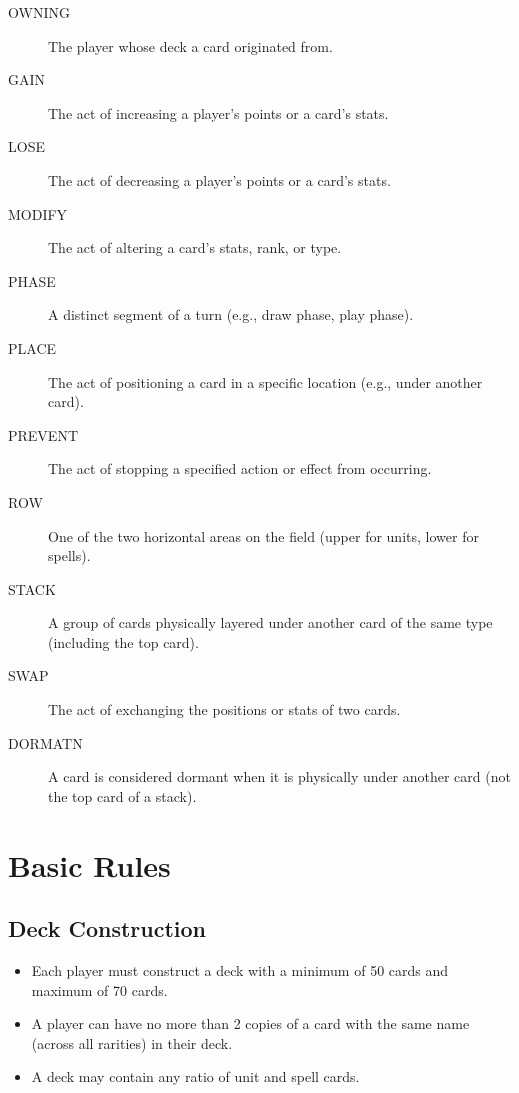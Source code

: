 \begin{description}
    \item[OWNING] The player whose deck a card originated from.
    \item[GAIN] The act of increasing a player’s points or a card’s stats.
    \item[LOSE] The act of decreasing a player’s points or a card’s stats.
    \item[MODIFY] The act of altering a card’s stats, rank, or type.
    \item[PHASE] A distinct segment of a turn (e.g., draw phase, play phase).
    \item[PLACE] The act of positioning a card in a specific location (e.g., under another card).
    \item[PREVENT] The act of stopping a specified action or effect from occurring.
    \item[ROW] One of the two horizontal areas on the field (upper for units, lower for spells).
    \item[STACK] A group of cards physically layered under another card of the same type (including the top card).
    \item[SWAP] The act of exchanging the positions or stats of two cards.
    \item[DORMATN] A card is considered dormant when it is physically under another card (not the top card of a stack).
\end{description}











\section{Basic Rules}

\subsection{Deck Construction}
\begin{itemize}
    \item Each player must construct a deck with a minimum of 50 cards and maximum of 70 cards.
    \item A player can have no more than 2 copies of a card with the same name (across all rarities) in their deck.
    \item A deck may contain any ratio of unit and spell cards.
\end{itemize}





